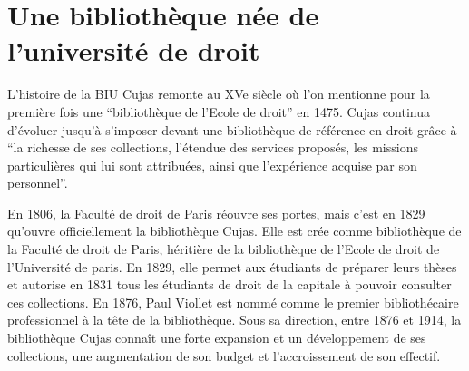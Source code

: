 \section[Naissance de la bibliothèque]{Une bibliothèque née de l'université de droit}
L'histoire de la BIU Cujas remonte au XVe siècle où l'on mentionne pour la première fois une  \enquote{bibliothèque de l'Ecole de droit} en 1475. Cujas continua d'évoluer jusqu'à s'imposer devant une bibliothèque de référence en droit grâce à \enquote{la richesse de ses collections, l'étendue des services proposés, les missions particulières qui lui sont attribuées, ainsi que l'expérience acquise par son personnel}.

En 1806, la Faculté de droit de Paris réouvre ses portes, mais c'est en 1829 qu'ouvre officiellement la bibliothèque Cujas. Elle est crée comme bibliothèque de la Faculté de droit de Paris, héritière de la bibliothèque de l'Ecole de droit de l'Université de paris. En 1829, elle permet aux étudiants de préparer leurs thèses et autorise en 1831 tous les étudiants de droit de la capitale à pouvoir consulter ces collections. En 1876, Paul Viollet est nommé comme le premier bibliothécaire professionnel à la tête de la bibliothèque. Sous sa direction, entre 1876 et 1914, la bibliothèque Cujas connaît une forte expansion et un développement de ses collections, une augmentation de son budget et l'accroissement de son effectif.   


